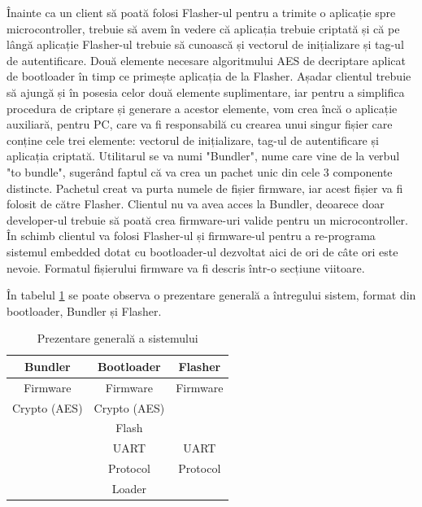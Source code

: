 \documentclass[12pt,a4paper,titlepage]{report}
\begin{document}
Înainte ca un client să poată folosi Flasher-ul pentru a trimite o aplicație spre microcontroller, trebuie să avem în vedere că aplicația trebuie criptată și că pe lângă aplicație Flasher-ul trebuie să cunoască și vectorul de inițializare și tag-ul de autentificare. Două elemente necesare algoritmului AES de decriptare aplicat de bootloader în timp ce primește aplicația de la Flasher. Așadar clientul trebuie să ajungă și în posesia celor două elemente suplimentare, iar pentru a simplifica procedura de criptare și generare a acestor elemente, vom crea încă o aplicație auxiliară, pentru PC, care va fi responsabilă cu crearea unui singur fișier care conține cele trei elemente: vectorul de inițializare, tag-ul de autentificare și aplicația criptată.
Utilitarul se va numi "Bundler", nume care vine de la verbul "to bundle", sugerând faptul că va crea un pachet unic din cele 3 componente distincte. Pachetul creat va purta numele de fișier firmware, iar acest fișier va fi folosit de către Flasher. Clientul nu va avea acces la Bundler, deoarece doar developer-ul trebuie să poată crea firmware-uri valide pentru un microcontroller. În schimb clientul va folosi Flasher-ul și firmware-ul pentru a re-programa sistemul embedded dotat cu bootloader-ul dezvoltat aici de ori de câte ori este nevoie. Formatul fișierului firmware va fi descris într-o secțiune viitoare.

În tabelul \ref{overview} se poate observa o prezentare generală a întregului sistem, format din bootloader, Bundler și Flasher.


\begin{table}[h]
    \begin{tabular}{ | c | c | c | }
        \hline
        \textbf{Bundler} & \textbf{Bootloader} & \textbf{Flasher} \\ \hline
        Firmware & Firmware & Firmware \\ \hline
        Crypto (AES) & Crypto (AES) &  \\ \hline
         & Flash &  \\ \hline        
         & UART & UART \\ \hline
         & Protocol & Protocol \\ \hline
         & Loader &  \\ \hline
    \end{tabular}
    \centering
    \caption{Prezentare generală a sistemului}
    \label{overview}
\end{table}
\end{document}
